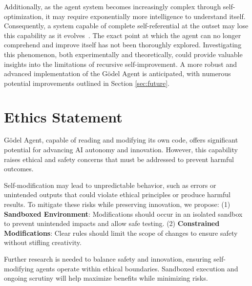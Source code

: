 \documentclass[11pt]{article}
\newcommand{\framework}{Gödel Agent\xspace}
\begin{document}

Additionally, as the agent system becomes increasingly complex through self-optimization, it may require exponentially more intelligence to understand itself. 
Consequently, a system capable of complete self-referential at the outset may lose this capability as it evolves~\citep{Yampolskiylimitation}. The exact point at which the agent can no longer comprehend and improve itself has not been thoroughly explored. Investigating this phenomenon, both experimentally and theoretically, could provide valuable insights into the limitations of recursive self-improvement.
A more robust and advanced implementation of the \framework is anticipated, with numerous potential improvements outlined in Section \ref{sec:future}. 


\section*{Ethics Statement}
\framework{}, capable of reading and modifying its own code, offers significant potential for advancing AI autonomy and innovation. However, this capability raises ethical and safety concerns that must be addressed to prevent harmful outcomes.

Self-modification may lead to unpredictable behavior, such as errors or unintended outputs that could violate ethical principles or produce harmful results. To mitigate these risks while preserving innovation, we propose:
(1) \textbf{Sandboxed Environment}: Modifications should occur in an isolated sandbox to prevent unintended impacts and allow safe testing.
(2) \textbf{Constrained Modifications}: Clear rules should limit the scope of changes to ensure safety without stifling creativity.

Further research is needed to balance safety and innovation, ensuring self-modifying agents operate within ethical boundaries. Sandboxed execution and ongoing scrutiny will help maximize benefits while minimizing risks.



% 
% 

\newpage
\appendix
\end{document}
